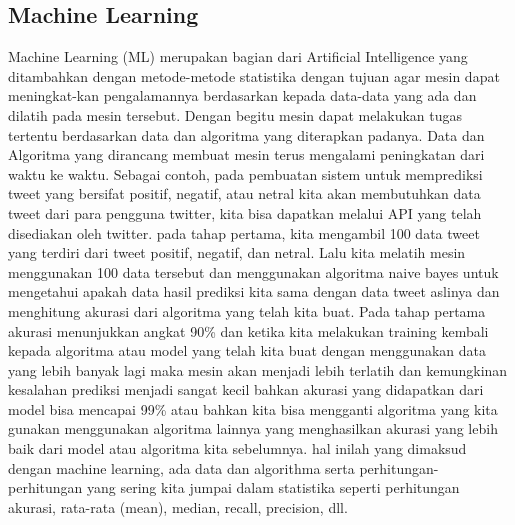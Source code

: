 \subsection{Machine Learning}
Machine Learning (ML) merupakan bagian dari Artificial Intelligence yang ditambahkan dengan metode-metode statistika dengan tujuan agar mesin dapat meningkat-kan pengalamannya berdasarkan kepada data-data yang ada dan dilatih pada mesin tersebut. Dengan begitu mesin dapat melakukan tugas tertentu berdasarkan data dan algoritma yang diterapkan padanya. Data dan Algoritma yang dirancang membuat mesin terus mengalami peningkatan dari waktu ke waktu. Sebagai contoh, pada pembuatan sistem untuk memprediksi tweet yang bersifat positif, negatif, atau netral kita akan membutuhkan data tweet dari para pengguna twitter, kita bisa dapatkan melalui API yang telah disediakan oleh twitter. pada tahap pertama, kita mengambil 100 data tweet yang terdiri dari tweet positif, negatif, dan netral. Lalu kita melatih mesin menggunakan 100 data tersebut dan menggunakan algoritma naive bayes untuk mengetahui apakah data hasil prediksi kita sama dengan data tweet aslinya dan menghitung akurasi dari algoritma yang telah kita buat. Pada tahap pertama akurasi menunjukkan angkat 90\% dan ketika kita melakukan training kembali kepada algoritma atau model yang telah kita buat dengan menggunakan data yang lebih banyak lagi maka mesin akan menjadi lebih terlatih dan kemungkinan kesalahan prediksi menjadi sangat kecil bahkan akurasi yang didapatkan dari model bisa mencapai 99\% atau bahkan kita bisa mengganti algoritma yang kita gunakan menggunakan algoritma lainnya yang menghasilkan akurasi yang lebih baik dari model atau algoritma kita sebelumnya. hal inilah yang dimaksud dengan machine learning, ada data dan algorithma serta perhitungan-perhitungan yang sering kita jumpai dalam statistika seperti perhitungan akurasi, rata-rata (mean), median, recall, precision, dll.

